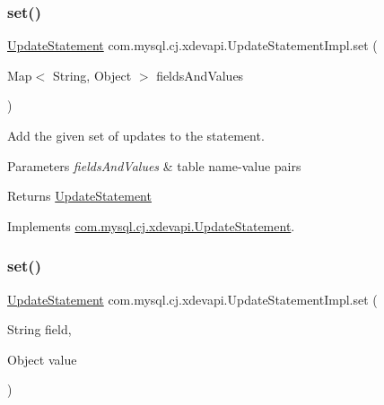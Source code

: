\subsubsection{\texorpdfstring{set()}{set()}\hspace{0.1cm}{\footnotesize\ttfamily [1/2]}}
{\footnotesize\ttfamily \mbox{\hyperlink{interfacecom_1_1mysql_1_1cj_1_1xdevapi_1_1_update_statement}{Update\+Statement}} com.\+mysql.\+cj.\+xdevapi.\+Update\+Statement\+Impl.\+set (\begin{DoxyParamCaption}\item[{Map$<$ String, Object $>$}]{fields\+And\+Values }\end{DoxyParamCaption})}

Add the given set of updates to the statement.


\begin{DoxyParams}{Parameters}
{\em fields\+And\+Values} & table name-\/value pairs \\
\hline
\end{DoxyParams}
\begin{DoxyReturn}{Returns}
\mbox{\hyperlink{interfacecom_1_1mysql_1_1cj_1_1xdevapi_1_1_update_statement}{Update\+Statement}} 
\end{DoxyReturn}


Implements \mbox{\hyperlink{interfacecom_1_1mysql_1_1cj_1_1xdevapi_1_1_update_statement_a55ee82b73b4faf50fa2ba7dbbd723819}{com.\+mysql.\+cj.\+xdevapi.\+Update\+Statement}}.

\mbox{\label{classcom_1_1mysql_1_1cj_1_1xdevapi_1_1_update_statement_impl_a6100d1574e2958c9aa1229e70a476e37}} 
\subsubsection{\texorpdfstring{set()}{set()}\hspace{0.1cm}{\footnotesize\ttfamily [2/2]}}
{\footnotesize\ttfamily \mbox{\hyperlink{interfacecom_1_1mysql_1_1cj_1_1xdevapi_1_1_update_statement}{Update\+Statement}} com.\+mysql.\+cj.\+xdevapi.\+Update\+Statement\+Impl.\+set (\begin{DoxyParamCaption}\item[{String}]{field,  }\item[{Object}]{value }\end{DoxyParamCaption})}

